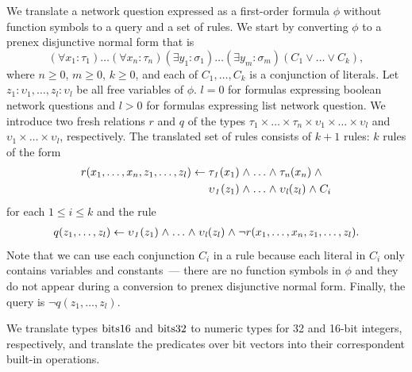We translate a network question expressed as a first-order formula $\phi$ without function symbols to a \Datalog query and a set of \Datalog rules. We start by converting $\phi$ to a prenex disjunctive normal form that is $$(\forall x_1:\tau_1)\ldots(\forall x_n:\tau_n)(\exists y_1:\sigma_1)\ldots(\exists y_m:\sigma_m)(C_1\vee\ldots\vee C_k),$$ where $n\ge0$, $m\ge0$, $k\ge0$, and each of $C_1,\ldots,C_k$ is a conjunction of literals. Let $z_1:\upsilon_1,\ldots,z_l:\upsilon_l$ be all free variables of $\phi$. $l=0$ for formulas expressing boolean network questions and $l>0$ for formulas expressing list network question. We introduce two fresh relations $r$ and $q$ of the types $\tau_1\times\ldots\times\tau_n\times\upsilon_1\times\ldots\times\upsilon_l$ and $\upsilon_1\times\ldots\times\upsilon_l$, respectively. The translated set of \Datalog rules consists of $k+1$ rules: $k$ rules of the form
\begin{align*}
r(x_1,\ldots,x_n,z_1,\ldots,z_l)\mathrel{\leftarrow}\;&\mathit{\tau_1}({x_1})\mathrel{\wedge}\ldots\mathrel{\wedge}\mathit{\tau_n}({x_n})\mathrel{\wedge}~\\
                                     &\mathit{\upsilon_1}({z_1})\mathrel{\wedge}\ldots\mathrel{\wedge}\mathit{\upsilon_l}({z_l})\mathrel{\wedge} C_i
\end{align*}
for each $1\le i\le k$ and the rule
\begin{align*}
q(z_1,\ldots,z_l)\mathrel{\leftarrow}\mathit{\upsilon_1}({z_1})\mathrel{\wedge}\ldots\mathrel{\wedge}\mathit{\upsilon_l}({z_l})\mathrel{\wedge}\neg r(x_1,\ldots,x_n,z_1,\ldots,z_l).
\end{align*}
Note that we can use each conjunction $C_i$ in a \Datalog rule because each literal in $C_i$ only contains variables and constants~--- there are no function symbols in $\phi$ and they do not appear during a conversion to prenex disjunctive normal form. Finally, the \Datalog query is $\neg q(z_1,\ldots,z_l)$.


We translate types $\mathrm{bits16}$ and $\mathrm{bits32}$ to numeric types for 32 and 16-bit integers, respectively, and translate the predicates over bit vectors into their correspondent built-in \souffle operations.

